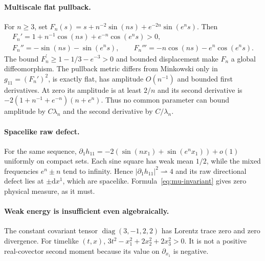\documentclass[11pt,a4paper]{article}
\numberwithin{equation}{section}
\newcommand{\dd}{\mathrm d}
\theoremstyle{definition}
\begin{document}
\paragraph{Multiscale flat pullback.}
For $n\geq3$, set $F_n(s)=s+n^{-2}\sin(ns)+e^{-2n}\sin(e^ns)$. Then
\begin{equation*}
\begin{gathered}
F_n'=1+n^{-1}\cos(ns)+e^{-n}\cos(e^ns)>0,\\
F_n''=-\sin(ns)-\sin(e^ns),\qquad
F_n'''=-n\cos(ns)-e^n\cos(e^ns).
\end{gathered}
\end{equation*}
The bound $F_n^\prime\geq1-1/3-e^{-3}>0$ and bounded displacement make $F_n$ a global diffeomorphism. The pullback metric differs from Minkowski only in $g_{11}=(F_n')^2$, is exactly flat, has amplitude $O(n^{-1})$ and bounded first derivatives. At zero its amplitude is at least $2/n$ and its second derivative is $-2(1+n^{-1}+e^{-n})(n+e^n)$. Thus no common parameter can bound amplitude by $C\lambda_n$ and the second derivative by $C/\lambda_n$.

\paragraph{Spacelike raw defect.}
For the same sequence, $\partial_1h_{11}=-2(\sin(nx_1)+\sin(e^nx_1))+o(1)$ uniformly on compact sets. Each sine square has weak mean $1/2$, while the mixed frequencies $e^n\pm n$ tend to infinity. Hence $|\partial_1h_{11}|^2\rightharpoonup4$ and its raw directional defect lies at $\pm\dd x^1$, which are spacelike. Formula~\eqref{eq:mu-invariant} gives zero physical measure, as it must.

\paragraph{Weak energy is insufficient even algebraically.}
The constant covariant tensor $\operatorname{diag}(3,-1,2,2)$ has Lorentz trace zero and zero divergence. For timelike $(t,x)$, $3t^2-x_1^2+2x_2^2+2x_3^2>0$. It is not a positive real-covector second moment because its value on $\partial_{x_1}$ is negative.
\end{document}
